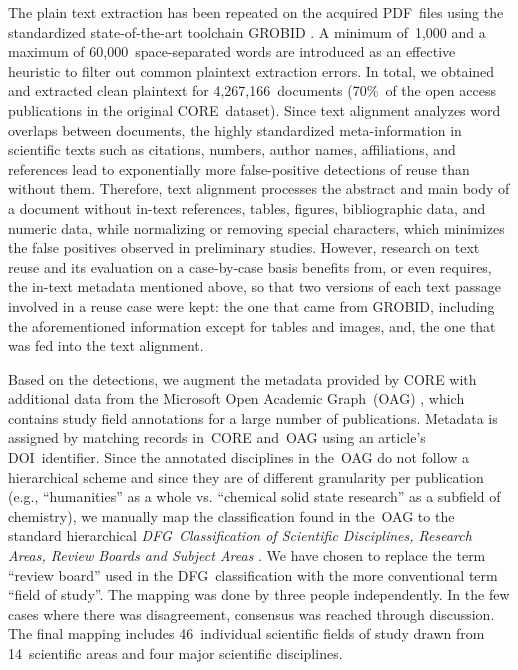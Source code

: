 \documentclass[fleqn,10pt]{wlscirep}
\begin{document}
The plain text extraction has been repeated on the acquired PDF~files using the standardized state-of-the-art toolchain GROBID \cite{lopez:2015}. A minimum of~1,000 and a maximum of 60,000~space-separated words are introduced as an effective heuristic to filter out common plaintext extraction errors. In total, we obtained and extracted clean plaintext for 4,267,166~documents (70\%~of the open access publications in the original CORE~dataset). Since text alignment analyzes word overlaps between documents, the highly standardized meta-information in scientific texts such as citations, numbers, author names, affiliations, and references lead to exponentially more false-positive detections of reuse than without them. Therefore, text alignment processes the abstract and main body of a document without in-text references, tables, figures, bibliographic data, and numeric data, while normalizing or removing special characters, which minimizes the false positives observed in preliminary studies. However, research on text reuse and its evaluation on a case-by-case basis benefits from, or even requires, the in-text metadata mentioned above, so that two versions of each text passage involved in a reuse case were kept: the one that came from GROBID, including the aforementioned information except for tables and images, and, the one that was fed into the text alignment.

Based on the detections, we augment the metadata provided by CORE with additional data from the Microsoft Open Academic Graph~(OAG) \cite{tang:2008,sinha:2015}, which contains study field annotations for a large number of publications. Metadata is assigned by matching records in~CORE and~OAG using an article's DOI~identifier. Since the annotated disciplines in the~OAG do not follow a hierarchical scheme and since they are of different granularity per publication (e.g., ``humanities'' as a whole vs. ``chemical solid state research'' as a subfield of chemistry), we manually map the classification found in the~OAG to the standard hierarchical \textit{DFG~Classification of Scientific Disciplines, Research Areas, Review Boards and Subject Areas} \cite{dfg:2016}. We have chosen to replace the term ``review board'' used in the DFG~classification with the more conventional term ``field of study''. The mapping was done by three people independently. In the few cases where there was disagreement, consensus was reached through discussion. The final mapping includes 46~individual scientific fields of study drawn from 14~scientific areas and four major scientific disciplines.
\end{document}
